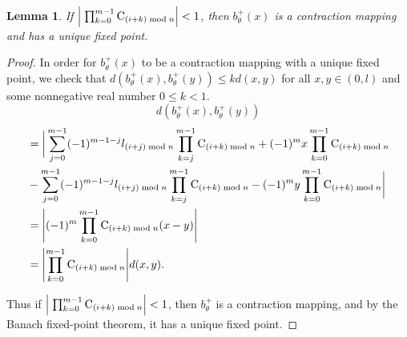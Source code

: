 \documentclass[10pt,a4paper]{article}
\newtheorem{lemma}{\bf Lemma}
\begin{document}
\begin{lemma} \label{Lemma:convexPolContrMap}
If $\abs{\;\prod_{k=0}^{m-1} \mathrm{C}_{(i+k)\bmod n}} < 1$, then $b^+_{\theta}(x)$ is a contraction mapping and has a unique fixed point.
\end{lemma}
\begin{proof}
In order for $b^+_{\theta}(x)$ to be a contraction mapping with a unique fixed point, we check that $ d(b^+_{\theta}(x), b^+_{\theta}(y)) \leq k d(x,y) $ for all $x, y \in (0,l)$ and some nonnegative real number $0 \leq k < 1$.
\begin{equation*}
d(b^+_{\theta}(x), b^+_{\theta}(y))
\end{equation*}
\begin{align*}
	& = \bigg| \sum_{j=0}^{m-1}(-1)^{m-1-j} l_{(i+j)\bmod n} \prod_{k=j}^{m-1} \mathrm{C}_{(i+k)\bmod n} + (-1)^{m}x \prod_{k=0}^{m-1} \mathrm{C}_{(i+k)\bmod n} \\ 
	& - \sum_{j=0}^{m-1}(-1)^{m-1-j} l_{(i+j)\bmod n} \prod_{k=j}^{m-1} \mathrm{C}_{(i+k)\bmod n} - (-1)^{m}y \prod_{k=0}^{m-1} \mathrm{C}_{(i+k)\bmod n} \bigg|  \\
    & = \abs{ (-1)^{m} \prod_{k=0}^{m-1} \mathrm{C}_{(i+k)\bmod n} (x-y)} \\
	& = \abs{\prod_{k=0}^{m-1} \mathrm{C}_{(i+k)\bmod n}} d(x,y).
\end{align*}

Thus if $\abs{\;\prod_{k=0}^{m-1} \mathrm{C}_{(i+k)\bmod n}} < 1$, then $b^+_{\theta}$ is a contraction mapping, and by the Banach fixed-point
theorem, it has a unique fixed point.
\end{proof}
\end{document}
